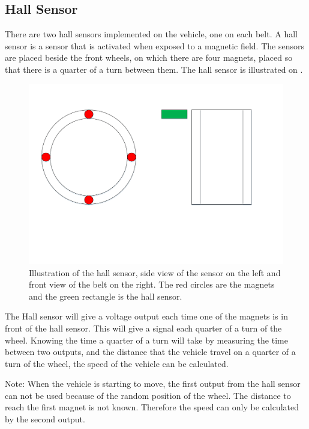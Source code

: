 \subsection{Hall Sensor}

There are two hall sensors implemented on the vehicle, one on each belt. A hall sensor is a sensor that is activated when exposed to a magnetic field. The sensors are placed beside the front wheels, on which there are four magnets, placed so that there is a quarter of a turn between them. The hall sensor is illustrated on .

 \begin{figure}[H]
	\centering
	\includegraphics[scale=0.5]{figures/HallSensorSide_Forward_view.pdf}
	\caption{Illustration of the hall sensor, side view of the sensor on the left and front view of the belt on the right. The red circles are the magnets and the green rectangle is the hall sensor.}
	\label{HallSensor}
\end{figure}

The Hall sensor will give a voltage output each time one of the magnets is in front of the hall sensor. This will give a signal each quarter of a turn of the wheel. Knowing the time a quarter of a turn will take by measuring the time between two outputs, and the distance that the vehicle travel on a quarter of a turn of the wheel, the speed of the vehicle can be calculated.

Note: When the vehicle is starting to move, the first output from the hall sensor can not be used because of the random position of the wheel. The distance to reach the first magnet is not known. Therefore the speed can only be calculated by the second output.